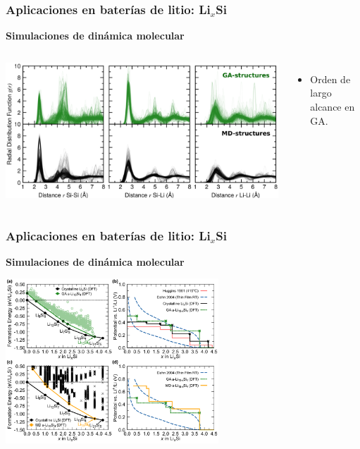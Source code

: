 \documentclass[aspectratio=169]{beamer}
\let\oldtextbf\textbf
\renewcommand{\textbf}[1]{\textcolor{nordblue}{\oldtextbf{#1}}}
\begin{document}
    \begin{frame}
        \frametitle{Aplicaciones en baterías de litio: Li$_x$Si}
        
        \textbf{Simulaciones de dinámica molecular}
        
        \begin{columns}
            \begin{center}
                \includegraphics[width=\columnwidth]{LiSi-rdfs.png}
            \end{center}

            \begin{itemize}
                \item Orden de largo alcance en GA. 
            \end{itemize}
        \end{columns}
            
    \end{frame}
    
    \begin{frame}
        \frametitle{Aplicaciones en baterías de litio: Li$_x$Si}
        
        \textbf{Simulaciones de dinámica molecular}
        
        \begin{center}
            \includegraphics[width=0.6\textwidth]{LiSi-potencial_vs_Li.png}
        \end{center}
            
    \end{frame}
    
\end{document}
